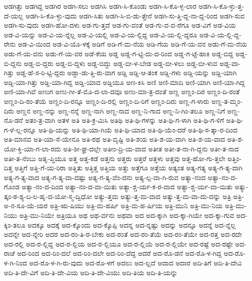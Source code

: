 {ಅಡಗಿತ್ತು
ಅಡಗಿದ್ದ
ಅಡಗಿರ
ಅಡಗಿ-ಸಲು
ಅಡಗಿಸಿ
ಅಡಗಿ-ಸಿ-ಕೊಂಡು
ಅಡಗಿ-ಸಿ-ಕೊ-ಳ್ಳ-ಲಾರ
ಅಡಗಿ-ಸಿ-ಕೊ-ಳ್ಳು-ತ್ತ-ದೆ-ಯಲ್ಲ
ಅಡಗಿ-ಸಿ-ಕೊ-ಳ್ಳು-ವುದು
ಅಡಗಿ-ಸಿತು
ಅಡಗಿ-ಸಿ-ಬಿ-ಡು-ತ್ತೇನೆ
ಅಡಗಿ-ಸು-ತ್ತಿ-ದ್ದ-ನಾ-ದ್ದ-ರಿಂದ
ಅಡಗಿ-ಸುವ
ಅಡಗಿ-ಸು-ವುದು
ಅಡಗಿ-ಹೋ-ದಳು
ಅಡ-ಗು-ತ್ತದೆ
ಅಡ-ಗು-ವಂತೆ
ಅಡ-ಗು-ವ-ವ-ರೆಗೂ
ಅಡ-ವಿಗೆ
ಅಡ-ವಿಯ
ಅಡ-ವಿ-ಯನ್ನು
ಅಡ-ವಿ-ಯ-ನ್ನೆಲ್ಲ
ಅಡ-ವಿ-ಯಲ್ಲಿ
ಅಡ-ವಿ-ಯ-ಲ್ಲಿದ್ದ
ಅಡ-ವಿ-ಯ-ಲ್ಲಿ-ದ್ದರೂ
ಅಡ-ವಿ-ಯ-ಲ್ಲಿ-ದ್ದ-ರೇನು
ಅಡ-ವಿ-ಯಿಂದ
ಅಡ-ವಿ-ಯೊ-ಳಕ್ಕೆ
ಅಡಿಗೆ
ಅಡಿ-ಗೆ-ಮ-ನೆಯ
ಅಡಿ-ಗೆಯ
ಅಡಿ-ಗೆ-ಯ-ವನ
ಅಡು-ಗೆ-ಮ-ನೆಯ
ಅಡು-ಗೆ-ಯ-ವನು
ಅಡು-ಗೆ-ಯ-ವರ
ಅಡೆ-ಕೆಯ
ಅಡ್ಡ
ಅಡ್ಡ-ಗ-ಟ್ಟಿ-ದು-ದ-ರಿಂದ
ಅಡ್ಡ-ಗ-ಟ್ಟೆ-ಹಾಕಿ
ಅಡ್ಡ-ಬಿದ್ದ
ಅಡ್ಡ-ಬಿ-ದ್ದನು
ಅಡ್ಡ-ಬಿ-ದ್ದರು
ಅಡ್ಡ-ಬಿ-ದ್ದಳು
ಅಡ್ಡ-ಬಿದ್ದು
ಅಡ್ಡ-ಬೀ-ಳ-ಬೇಡ
ಅಡ್ಡ-ಬೀ-ಳಲು
ಅಡ್ಡ-ಬೀ-ಳುವ
ಅಡ್ಡ-ವಾ-ಗಿತ್ತು
ಅಡ್ಡ-ಹೆ-ಸ-ರಿ-ಟ್ಟಿ-ದ್ದರು
ಅಡ್ಡಾ-ಡು-ತ್ತಿ-ರು-ವಾಗ
ಅಡ್ಡಿ
ಅಡ್ಡಿ-ಆ-ತಂಕ
ಅಡ್ಡಿ-ಗಳು
ಅಡ್ಡಿ-ಯನ್ನು
ಅಡ್ಡಿ-ಯಾಗಿ
ಅಡ್ಡಿ-ಯಾ-ಗಿತ್ತು
ಅಡ್ಡಿ-ಯಾ-ಗಿದ್ದ
ಅಡ್ಡಿ-ಯಾದ
ಅಡ್ಡಿಯೂ
ಅಣ-ಕಿಸಿ
ಅಣಿ
ಅಣಿ-ಮಾದಿ
ಅಣಿ-ಯಾಗಿ
ಅಣಿ-ಯಾ-ಗಿದ್ದ
ಅಣಿ-ಯಾ-ಗಿವೆ
ಅಣುಗ
ಅಣು-ಗೀ-ತೆ-ಮೊ-ದ-ಲಾ-ದವೂ
ಅಣು-ಮಾ-ತ್ರ-ದಂತೆ
ಅಣ್ಣ
ಅಣ್ಣಂ-ದಿರ
ಅಣ್ಣಂ-ದಿ-ರಂತೆ
ಅಣ್ಣಂ-ದಿ-ರಂ-ತೆಯೆ
ಅಣ್ಣಂ-ದಿ-ರನ್ನೂ
ಅಣ್ಣಂ-ದಿ-ರಲ್ಲಿ
ಅಣ್ಣಂ-ದಿ-ರಿಗೆ
ಅಣ್ಣಂ-ದಿರು
ಅಣ್ಣ-ಗ-ಳಾರು
ಅಣ್ಣ-ತ-ಮ್ಮಂ-ದಿರು
ಅಣ್ಣನ
ಅಣ್ಣ-ನನ್ನು
ಅಣ್ಣ-ನನ್ನೆ
ಅಣ್ಣ-ನಾಗಿ
ಅಣ್ಣ-ನಾದ
ಅಣ್ಣ-ನಿ-ಗಾದ
ಅಣ್ಣ-ನಿ-ಗಿಂ-ತಲೂ
ಅಣ್ಣ-ನಿಗೆ
ಅಣ್ಣ-ನೊ-ಡನೆ
ಅತಂ-ತ್ರ-ವಾಗಿ
ಅತಳ
ಅತಿ
ಅತಿ-ಕ್ರ-ಮಿಸಿ
ಅತಿಥಿ
ಅತಿ-ಥಿ-ಗಳನ್ನು
ಅತಿ-ಥಿ-ಗ-ಳಾಗಿ
ಅತಿ-ಥಿ-ಗ-ಳಿಗೆ
ಅತಿ-ಥಿ-ಗ-ಳೆ-ಲ್ಲ-ರನ್ನೂ
ಅತಿ-ಥಿ-ಯನ್ನು
ಅತಿ-ಥಿ-ಯಾ-ಗಿಯೆ
ಅತಿ-ಥಿ-ಯಾದ
ಅತಿ-ಥಿ-ಯೆಂ-ದರೆ
ಅತಿ-ಥಿ-ಸ-ತ್ಕಾ-ರ-ದಿಂದ
ಅತಿ-ಮಾನವ
ಅತಿ-ಯಾ-ಸೆ-ಯೇನೂ
ಅತಿ-ರಥ
ಅತಿ-ವೃಷ್ಟಿ
ಅತಿ-ಶಯ
ಅತಿ-ಶ-ಯ-ವಾಗಿ
ಅತಿ-ಶ-ಯ-ವಾದ
ಅತಿ-ಶ-ಯೋ-ಕ್ತಿ-ಯಾ-ಗ-ಲಾ-ರದು
ಅತಿ-ಶೀ-ಘ್ರ-ದಲ್ಲೇ
ಅತೀಂ-ದ್ರಿ-ಯ-ವಾದ
ಅತೀತ
ಅತೀ-ತ-ನಾ-ಗಿ-ದ್ದನು
ಅತೀ-ತ-ನಾದ
ಅತೀ-ತ-ನೆಂಬು
ಅತೃ-ಪ್ತಿಯೂ
ಅತ್ತ
ಅತ್ತ-ಕಡೆ
ಅತ್ತನು
ಅತ್ತರು
ಅತ್ತರೆ
ಅತ್ತಳು
ಅತ್ತವು
ಅತ್ತ-ಹೋ-ಗು-ತ್ತಲೇ
ಅತ್ತಿಂ-ದಿತ್ತ
ಅತ್ತಿಗೆ
ಅತ್ತಿ-ಗೆ-ಯ-ರಿರಾ
ಅತ್ತಿತು
ಅತ್ತಿತ್ತ
ಅತ್ತಿಯ
ಅತ್ತು
ಅತ್ತೆಗೂ
ಅತ್ತೆಯ
ಅತ್ಯಂತ
ಅತ್ಯ-ಗತ್ಯ
ಅತ್ಯ-ಗ-ತ್ಯ-ವಾಗಿ
ಅತ್ಯ-ಗ-ತ್ಯ-ವಾದ
ಅತ್ಯ-ಗ-ತ್ಯ-ವಾ-ದಷ್ಟು
ಅತ್ಯ-ಗ-ತ್ಯ-ವೆಂ-ದನು
ಅತ್ಯ-ಲ್ಪ-ವಾ-ಗಿ-ರುವ
ಅತ್ಯಾ-ನಂದ
ಅತ್ಯಾ-ನಂ-ದ-ಗೊಂಡ
ಅತ್ಯಾ-ನಂ-ದ-ದಿಂದ
ಅತ್ಯಾ-ನಂ-ದ-ವಾ-ಯಿತು
ಅತ್ಯಾ-ಶ್ಚ-ರ್ಯ-ಕ-ರ-ವಾದ
ಅತ್ಯಾ-ಶ್ಚ-ರ್ಯ-ವಾ-ಯಿತು
ಅತ್ಯು-ತ್ಕಂ-ಠ-ಶ್ಯ-ಬ-ಲ-ಹೃ-ದ-ಯೋ-ಸ್ಮ-ದ್ವಿಧೋ
ಅತ್ಯು-ತ್ತಮ
ಅತ್ಯು-ತ್ತ-ಮ-ವಾದ
ಅತ್ಯು-ತ್ತ-ಮ-ವಾ-ದು-ದನ್ನು
ಅತ್ರಿ
ಅತ್ರಿ-ಅ-ನ-ಸೂ-ಯೆ-ಯರ
ಅತ್ರಿ-ಋ-ಷಿಯು
ಅತ್ರಿ-ಮ-ಹರ್ಷಿ
ಅತ್ರಿ-ಮ-ಹ-ರ್ಷಿಯ
ಅತ್ರಿ-ಮುನಿ
ಅತ್ರಿ-ಮು-ನಿಯ
ಅತ್ರಿ-ಮು-ನಿಯು
ಅತ್ರಿ-ಮು-ನಿಯೇ
ಅತ್ರಿಯೂ
ಅಥ
ಅಥ-ರ್ವನು
ಅಥವಾ
ಅದ
ಅದ-ಕ್ಕಾಗಿ
ಅದ-ಕ್ಕಾ-ಗಿಯೇ
ಅದ-ಕ್ಕಾ-ಗುವ
ಅದ-ಕ್ಕಿಂ-ತಲೂ
ಅದಕ್ಕೂ
ಅದಕ್ಕೆ
ಅದ-ಕ್ಕೊಂದು
ಅದ-ಕ್ಕೊಪ್ಪಿ
ಅದನ್ನ
ಅದ-ನ್ನಷ್ಟು
ಅದನ್ನು
ಅದನ್ನೂ
ಅದನ್ನೆ
ಅದ-ನ್ನೆಲ್ಲ
ಅದನ್ನೇ
ಅದ-ನ್ನೇರಿ
ಅದರ
ಅದ-ರಂ-ತಿ-ರ-ಬೇಕು
ಅದ-ರಂತೆ
ಅದ-ರಂ-ತೆಯೆ
ಅದ-ರಂ-ತೆಯೇ
ಅದ-ರತ್ತ
ಅದ-ರದೇ
ಅದ-ರಲ್ಲಿ
ಅದ-ರ-ಲ್ಲಿದ್ದ
ಅದ-ರ-ಲ್ಲಿಯ
ಅದ-ರ-ಲ್ಲಿಯೂ
ಅದ-ರ-ಲ್ಲಿಯೆ
ಅದ-ರ-ಲ್ಲಿಯೇ
ಅದ-ರಷ್ಟೆ
ಅದ-ರಷ್ಟೇ
ಅದ-ರಾಚೆ
ಅದ-ರಿಂದ
ಅದ-ರಿಂ-ದಲೆ
ಅದ-ರಿಂ-ದಲೇ
ಅದ-ರಿಂ-ದೆದ್ದ
ಅದರೆ
ಅದ-ರೊ-ಡನೆ
ಅದ-ರೊ-ಳ-ಗಿದ್ದ
ಅದ-ರೊ-ಳ-ಗಿ-ನಿಂದ
ಅದ-ರೊ-ಳ-ಗಿ-ರು-ವುದು
ಅದ-ರೊ-ಳಗೆ
ಅದಲು
ಅದ-ಲ್ಲದೆ
ಅದಾದ
ಅದಾರ
ಅದಿ-ತಿಗೆ
ಅದಿ-ತಿ-ದೇವಿ
ಅದಿ-ತಿ-ದೇ-ವಿಗೆ
ಅದಿ-ತಿ-ದೇ-ವಿಯ
ಅದಿ-ತಿ-ದೇ-ವಿಯು
ಅದಿ-ತಿಯ
ಅದಿ-ತಿ-ಯನ್ನು
}
